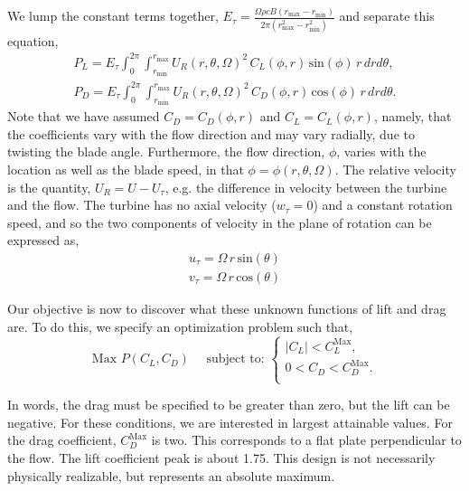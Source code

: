 We lump the constant terms together, $E_{\tau} = \frac{\Omega \rho c B (r_{\text{max}}-r_{\text{min}})}{2 \pi(r_{\text{max}}^2-r_{\text{min}}^2)}$ and separate this equation, 
\begin{align}
 P_L = E_\tau
 \int_0^{2\pi}
  \int_{r_{\text{min}}}^{r_{\text{max}}} U_R(r,\theta,\Omega)^2 \, C_L(\phi,r)
 \,\text{sin}(\phi)\, r\,dr d\theta,  \label{lift} \\
 P_D = E_\tau
 \int_0^{2\pi}
  \int_{r_{\text{min}}}^{r_{\text{max}}} U_R(r,\theta,\Omega)^2 \, C_D(\phi,r) \,\text{cos}(\phi)\, r\,dr d\theta. \label{drag}
\end{align}
Note that we have assumed $C_D = C_D(\phi,r)$ and $C_L = C_L(\phi,r)$,
namely, that the coefficients vary with the flow direction and may vary
radially, due to twisting the blade angle. Furthermore, the flow
direction, $\phi$, varies with the location as well as the blade speed,
in that $\phi=\phi(r,\theta,\Omega)$. The relative velocity is the
quantity, $U_R = U - U_\tau$, e.g. the difference in velocity between
the turbine and the flow. The turbine has no axial velocity ($w_\tau = 0$) and a
constant rotation speed, and so the two components of velocity in the
plane of rotation can be expressed as,
\begin{align}
 u_\tau = \Omega \,r\, \text{sin}(\theta)\\
 v_\tau = \Omega \,r\, \text{cos}(\theta)
\end{align}

Our objective is now to discover what these unknown functions of lift
and drag are. To do this, we specify an optimization problem such that, 
\begin{equation*} 
 \text{Max } P(C_L,C_D) \quad \text{ subject to: }
  \begin{cases}
   |C_L| < C_L^{\text{Max}}, \\
   0 < C_D < C_D^{\text{Max}}. \\
  \end{cases}
\end{equation*}

In words, the drag must be specified to be greater than zero, but
the lift can be negative. For these conditions, we are interested in
largest attainable values. For the drag coefficient, $C_D^{\text{Max}}$
is two. %
This corresponds to a flat plate perpendicular to the flow.
The lift coefficient peak is about 1.75. This design is not necessarily
physically realizable, but represents an absolute maximum. 

